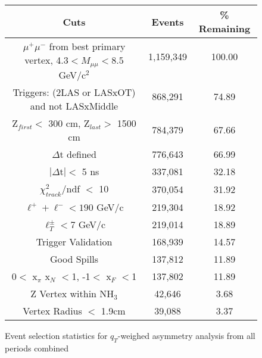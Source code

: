 \begin{figure}[h!t]
  \centering
    \begin{tabular}{ |c|c|c| }
      \hline \textbf{Cuts}& \textbf{Events} & \textbf{\% Remaining} \\ \hline

      \multirow{2}{15em}{$\mu^+\mu^-$ from best primary vertex,
        4.3$<M_{\mu\mu}<8.5$ GeV/c$^2$}& 1,159,349& 100.00\\ & & \\ \hline
      
      \multirow{2}{14em}{Triggers: (2LAS or LASxOT) and not LASxMiddle}& 
      868,291& 74.89\\ & & \\ \hline
      
      Z$_{first} <$ 300 cm, Z$_{last} >$ 1500 cm& 784,379& 67.66\\ \hline

      $\Delta$t defined& 776,643& 66.99\\ \hline
      
      $|\Delta\mathrm{t}| <$ 5 ns& 337,081& 32.18\\ \hline

      $\chi^2_{track}$/ndf $<$ 10& 370,054& 31.92\\ \hline

      $\ell^+ + \ell^- < 190$ GeV/c& 219,304& 18.92\\ \hline

      $\ell_T^\pm < 7$ GeV/c& 219,014& 18.89\\ \hline

      Trigger Validation& 168,939& 14.57\\ \hline

      Good Spills& 137,812& 11.89\\ \hline

      0$<$ x$_{\pi}$ x$_N$ $<$1, -1$<$ x$_F$ $<$1& 137,802& 11.89  \\ \hline

      Z Vertex within NH$_3$& 42,646& 3.68\\ \hline

      Vertex Radius $<$ 1.9cm& 39,088& 3.37\\ \hline

    \end{tabular}
    \caption{Event selection statistics for $q_T$-weighed asymmetry analysis
      from all periods combined}
    \label{tab::qt_EventTable}
\end{figure}

